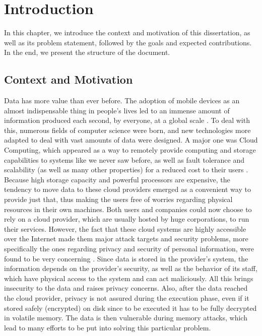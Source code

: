 \newcommand{\novathesis}{\emph{novathesis}}
\newcommand{\novathesisclass}{\texttt{novathesis.cls}}


\chapter{Introduction}
\label{cha:introduction}

In this chapter, we introduce the context and motivation of this dissertation, as well as its problem statement, followed by the goals and expected contributions. In the end, we present the structure of the document.




\section{Context and Motivation}
Data has more value than ever before. 
The adoption of mobile devices as an almost indispensable thing in people's lives led to an immense amount of information produced each second, by everyone, at a global scale \cite{dataAnalysis1}\cite{dataAnalysis2}.
To deal with this, numerous fields of computer science were born, and new technologies more adapted to deal with vast amounts of data were designed. 
A major one was Cloud Computing, which appeared as a way to remotely provide computing and storage capabilities to systems like we never saw before, as well as fault tolerance and scalability (as well as many other properties) for a reduced cost to their users \cite{cloudOrigins}. 
Because high storage capacity and powerful processors are expensive, the tendency to move data to these cloud providers emerged as a convenient way to provide just that, thus making the users free of worries regarding physical resources in their own machines. Both users and companies could now choose to rely on a cloud provider, which are usually hosted by huge corporations, to run their services.
However, the fact that these cloud systems are highly accessible over the Internet made them major attack targets \cite{cloudAttacksReport} and security problems, more specifically the ones regarding privacy and security of personal information, were found to be very concerning \cite{playstationAttack}. 
Since data is stored in the provider's system, the information depends on the provider's security, as well as the behavior of its staff, which have physical access to the system and can act maliciously. All this brings insecurity to the data and raises privacy concerns.
Also, after the data reached the cloud provider, privacy is not assured during the execution phase, even if it stored safely (encrypted) on disk since to be executed it has to be fully decrypted in volatile memory. The data is then vulnerable during memory attacks, which lead to many efforts to be put into solving this particular problem.  

